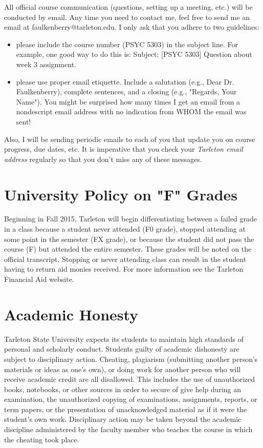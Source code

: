 \documentclass[10pt]{article}
\begin{document}
All official course communication (questions, setting up a meeting, etc.) will be conducted by email.  Any time you need to contact me, feel free to send me an email at faulkenberry@tarleton.edu.  I only ask that you adhere to two guidelines:
\begin{itemize}
\item please include the course number (PSYC 5303) in the subject line.  For example, one good way to do this is:  Subject: [PSYC 5303] Question about week 3 assignment.
\item please use proper email etiquette.  Include a salutation (e.g., Dear Dr. Faulkenberry), complete sentences, and a closing (e.g., "Regards, Your Name").  You might be surprised how many times I get an email from a nondescript email address with no indication from WHOM the email was sent!
\end{itemize}

Also, I will be sending periodic emails to each of you that update you on course progress, due dates, etc.  It is imperative that you check your \emph{Tarleton email address} regularly so that you don't miss any of these messages.

\section*{University Policy on "F" Grades}
\label{sec:org4172589}
Beginning in Fall 2015, Tarleton will begin differentiating between a failed grade in a class because a student never attended (F0 grade), stopped attending at some point in the semester (FX grade), or because the student did not pass the course (F) but attended the entire semester. These grades will be noted on the official transcript. Stopping or never attending class can result in the student having to return aid monies received.  For more information see the Tarleton Financial Aid website.

\section*{Academic Honesty}
\label{sec:org6a91636}

Tarleton State University expects its students to maintain high standards of personal and scholarly conduct. Students guilty of academic dishonesty are subject to disciplinary action. Cheating, plagiarism (submitting another person’s materials or ideas as one’s own), or doing work for another person who will receive academic credit are all disallowed. This includes the use of unauthorized books, notebooks, or other sources in order to secure of give help during an examination, the unauthorized copying of examinations, assignments, reports, or term papers, or the presentation of unacknowledged material as if it were the student’s own work. Disciplinary action may be taken beyond the academic discipline administered by the faculty member who teaches the course in which the cheating took place.
\end{document}
